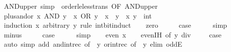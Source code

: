 \begin{isabellebody}
\isamarkupfalse%
\ AND{\isacharunderscore}{\kern0pt}upper{}{\isacharprime}{\kern0pt}{\isacharprime}{\kern0pt}\ {\isacharbrackleft}{\kern0pt}simp{\isacharbrackright}{\kern0pt}\ {\isacharequal}{\kern0pt}\ order{\isacharunderscore}{\kern0pt}le{\isacharunderscore}{\kern0pt}less{\isacharunderscore}{\kern0pt}trans\ {\isacharbrackleft}{\kern0pt}OF\ AND{\isacharunderscore}{\kern0pt}upper{}{\isacharbrackright}{\kern0pt}\ \isanewline
\isanewline
{}\isamarkupfalse%
\ plus{\isacharunderscore}{\kern0pt}and{\isacharunderscore}{\kern0pt}or{\isacharcolon}{\kern0pt}\ {\isacartoucheopen}{\isacharparenleft}{\kern0pt}x\ AND\ y{\isacharparenright}{\kern0pt}\ {\isacharplus}{\kern0pt}\ {\isacharparenleft}{\kern0pt}x\ OR\ y{\isacharparenright}{\kern0pt}\ {\isacharequal}{\kern0pt}\ x\ {\isacharplus}{\kern0pt}\ y{\isacartoucheclose}\ \ x\ y\ {\isacharcolon}{\kern0pt}{\isacharcolon}{\kern0pt}\ int\isanewline
%
\isadelimproof
%
\endisadelimproof
%
\isatagproof
{}\isamarkupfalse%
\ {\isacharparenleft}{\kern0pt}induction\ x\ arbitrary{\isacharcolon}{\kern0pt}\ y\ rule{\isacharcolon}{\kern0pt}\ int{\isacharunderscore}{\kern0pt}bit{\isacharunderscore}{\kern0pt}induct{\isacharparenright}{\kern0pt}\isanewline
\ \ \isamarkupfalse%
\ zero\isanewline
\ \ \isamarkupfalse%
\ \isamarkupfalse%
\ {\isacharquery}{\kern0pt}case\isanewline
\ \ \ \ \isamarkupfalse%
\ simp\isanewline
{}\isamarkupfalse%
\isanewline
\ \ \isamarkupfalse%
\ minus\isanewline
\ \ \isamarkupfalse%
\ \isamarkupfalse%
\ {\isacharquery}{\kern0pt}case\isanewline
\ \ \ \ \isamarkupfalse%
\ simp\isanewline
{}\isamarkupfalse%
\isanewline
\ \ \isamarkupfalse%
\ {\isacharparenleft}{\kern0pt}even\ x{\isacharparenright}{\kern0pt}\isanewline
\ \ \isamarkupfalse%
\ even{\isachardot}{\kern0pt}IH\ {\isacharbrackleft}{\kern0pt}of\ {\isacartoucheopen}y\ div\ {}{\isacartoucheclose}{\isacharbrackright}{\kern0pt}\isanewline
\ \ \isamarkupfalse%
\ {\isacharquery}{\kern0pt}case\isanewline
\ \ \ \ \isamarkupfalse%
\ {\isacharparenleft}{\kern0pt}auto\ simp\ add{\isacharcolon}{\kern0pt}\ and{\isacharunderscore}{\kern0pt}int{\isacharunderscore}{\kern0pt}rec\ {\isacharbrackleft}{\kern0pt}of\ {\isacharunderscore}{\kern0pt}\ y{\isacharbrackright}{\kern0pt}\ or{\isacharunderscore}{\kern0pt}int{\isacharunderscore}{\kern0pt}rec\ {\isacharbrackleft}{\kern0pt}of\ {\isacharunderscore}{\kern0pt}\ y{\isacharbrackright}{\kern0pt}\ elim{\isacharcolon}{\kern0pt}\ oddE{\isacharparenright}{\kern0pt}\isanewline

\end{isabellebody}
